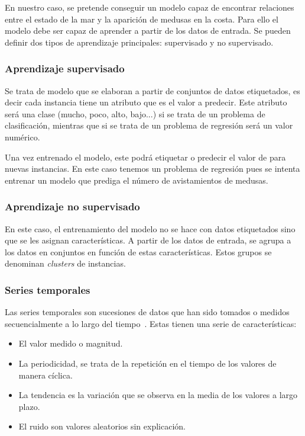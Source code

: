 En nuestro caso, se pretende conseguir un modelo capaz de encontrar relaciones entre el estado de la mar y la aparición de medusas en la costa. Para ello el modelo debe ser capaz de aprender a partir de los datos de entrada. Se pueden definir dos tipos de aprendizaje principales: supervisado y no supervisado.

\subsubsection{Aprendizaje supervisado}
Se trata de modelo que se elaboran a partir de conjuntos de datos etiquetados, es decir cada instancia tiene un atributo que es el valor a predecir. Este atributo será una clase (mucho, poco, alto, bajo...) si se trata de un problema de clasificación, mientras que si se trata de un problema de regresión será un valor numérico.

Una vez entrenado el modelo, este podrá etiquetar o predecir el valor de para nuevas instancias.
En este caso tenemos un problema de regresión pues se intenta entrenar un modelo que prediga el número de avistamientos de medusas.

\subsubsection{Aprendizaje no supervisado}
En este caso, el entrenamiento del modelo no se hace con datos etiquetados sino que se les asignan características. A partir de los datos de entrada, se agrupa a los datos en conjuntos en función de estas características. Estos grupos se denominan \emph{clusters} de instancias.

\subsubsection{Series temporales}
Las series temporales son sucesiones de datos que han sido tomados o medidos  secuencialmente a lo largo del tiempo~\cite{SeriesTempUBU}.
Estas tienen una serie de características:
\begin{itemize}
	\item El valor medido o magnitud.
	\item La periodicidad, se trata de la repetición en el tiempo de los valores de manera cíclica.
	\item La tendencia es la variación que se observa en la media de los valores a largo plazo.
	\item El ruido son valores aleatorios sin explicación.
\end{itemize}

